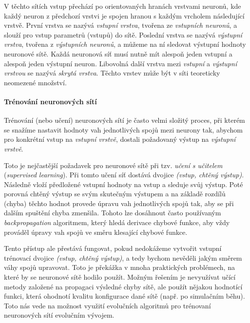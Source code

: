 V těchto sítích vstup přechází po orientovaných hranách vrstvami neuronů, kde
každý neuron z předchozí vrstvi je spojen hranou s každým vrcholem následující
vrstvě. První vrstva se nazývá \emph{vstupní vrstva}, tvořena ze
\emph{vstupních neuronů}, a slouží pro vstup parametrů (vstupů) do sítě.
Poslední vrstva se nazývá \emph{výstupní vrstva}, tvořena z \emph{výstupních
neuronů}, a můžeme na ní sledovat výstupní hodnoty neuronové sítě. Každá
neuronová síť musí nutně mít alespoň jeden vstupní a alespoň jeden výstupní
neuron. Libovolná další vrstva mezi \emph{vstupní} a \emph{výstupní vrstvou} se
nazývá \emph{skrytá vrstva}. Těchto vrstev může být v síti teoreticky neomezené
množství.

\paragraph{Trénování neuronových sítí}
Trénování (nebo učení) neuronových sítí je často velmi složitý proces, při
kterém se snažíme nastavit hodnoty vah jednotlivých spojů mezi neurony tak,
abychom pro konkrétní vstup na \emph{vstupní vrstvě}, dostali požadovaný výstup
na \emph{výstupní vrstvě}. 

Toto je nejčastější požadavek pro neuronové sítě při tzv. \emph{učení s
učitelem} (\emph{supervised learning}). Při tomto učení síť dostává dvojice
\emph{(vstup, chtěný výstup)}. Následně vloží předložené vstupní hodnoty na vstup a
sleduje svůj výstup. Poté porovná chtěný výstup se svým skutečným výstupem a na
základě rozdílů (chyba) těchto hodnot provede úpravu vah jednotlivých spojů
tak, aby se při dalším spuštění chyba zmenšila. Tohoto lze dosáhnout často
používaným \emph{backpropagation} algoritmem, který hledá derivace chybové
funkce, aby vždy prováděl úpravy vah spojů ve směru klesající chybové funkce.

Tento přístup ale přestává fungovat, pokud nedokážeme vytvořit vstupní
trénovací dvojice \emph{(vstup, chtěný výstup)}, a tedy bychom nevěděli jakým
směrem váhy spojů upravovat. Toto je překážka v mnoha praktických problémech,
na které by se neuronové sítě hodilo použít. Možným řešením je nevyužívat učící
metody založené na propagaci výsledné chyby sítě, ale použít nějakou hodnotící
funkci, která ohodnotí kvalitu konfigurace dané sítě (např. po simulačním
běhu). Toto nás vede na možnost využití evolučních algoritmů pro trénovaní
neuronových sítí evolučním vývojem.


